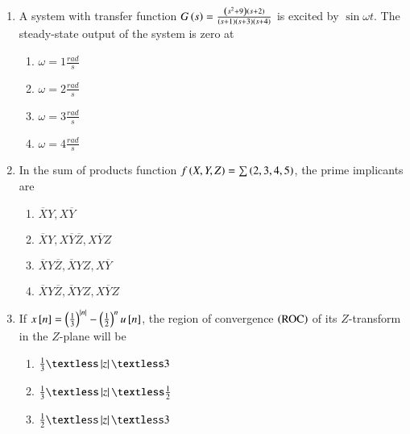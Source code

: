 \documentclass[journal]{IEEEtran}
\begin{document}
\begin{enumerate}
{\begin{figure}[H]
\label{fig:my_label}
\end{figure}
\begin{multicols}{4}
\begin{enumerate}
\item $50\Omega$
\item $100\Omega$
\item $5k\Omega$
\item $10.1k\Omega$
\end{enumerate}
\end{multicols}
}
\item{
A system with transfer function $G\left(s\right)=\frac{\left(s^2+9\right)\left(s+2\right)}{\left(s+1\right)\left(s+3\right)\left(s+4\right)}$ is excited by $\sin\omega t$. The steady-state output of the system is zero at
\begin{multicols}{4}
\begin{enumerate}
\item $\omega=1\frac{rad}{s}$
\item $\omega=2\frac{rad}{s}$
\item $\omega=3\frac{rad}{s}$
\item $\omega=4\frac{rad}{s}$
\end{enumerate}
\end{multicols}
}
\item{
In the sum of products function $f\left(X,Y,Z\right)=\sum\left(2,3,4,5\right)$, the prime implicants are 
\begin{multicols}{4}
\begin{enumerate}
\item $\overline{X}Y,X\overline{Y}$
\item $\overline{X}Y,X\overline{Y}\overline{Z},X\overline{Y}Z$
\item $\overline{X}Y\overline{Z},\overline{X}YZ,X\overline{Y}$
\item $\overline{X}Y\overline{Z},\overline{X}YZ,X\overline{Y}Z$
\end{enumerate}
\end{multicols}
}
\item{
If $x{}\left[n\right]=\left(\frac{1}{3}\right)^{\left\vert n\right\vert}-\left(\frac{1}{2}\right)^nu{}\left[n\right]$, the region of convergence $\left(\text{ROC}\right)$ of its $Z$-transform in the $Z$-plane will be
\begin{multicols}{4}
\begin{enumerate}
\item $\frac{1}{3}\textless\abs{z}\textless 3$
\item $\frac{1}{3}\textless\abs{z}\textless\frac{1}{2}$
\item $\frac{1}{2}\textless\abs{z}\textless 3$

\end{enumerate}
\end{multicols}}
\end{enumerate}
\end{document}
